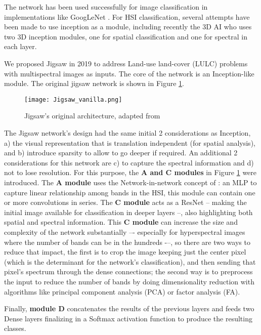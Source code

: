 \documentclass[lettersize, journal]{IEEEtran}
\begin{document}
The network has been used successfully for image classification in implementations like GoogLeNet \cite{szegedy_going_2015}. For HSI classification, several attempts have been made to use inception as a module, including recently the 3D AI \cite{fang_hyperspectral_2022} who uses two 3D inception modules, one for spatial classification and one for spectral in each layer.

We proposed Jigsaw in 2019 \cite{moraga_jigsaw_2019} to address Land-use land-cover (LULC) problems with multispectral images as inputs. The core of the network is an Inception-like module. The original jigsaw network is shown in Figure \ref{fig:Jigsaw}.

\begin{figure}[!htb]
    \centering
    \texttt{[image: Jigsaw\_vanilla.png]}
    \caption{Jigsaw's original architecture, adapted from \cite{moraga_monitoring_2020}}
    \label{fig:Jigsaw}
\end{figure}

The Jigsaw network’s design had the same initial 2 considerations as Inception, a) the visual representation that is translation independent (for spatial analysis), and b) introduce sparsity to allow to go deeper if required. An additional 2 considerations for this network are c) to capture the spectral information and d) not to lose resolution. For this purpose, the \textbf{A and C modules} in Figure \ref{fig:Jigsaw} were introduced. The \textbf{A module} uses the Network-in-network concept of \cite{lin_network_2014}: an MLP to capture linear relationship among bands in the HSI, this module can contain one or more   convolutions in series. The \textbf{C module} acts as a ResNet \cite{he_deep_2016} -- making the initial image available for classification in deeper layers --, also highlighting both spatial and spectral information. This \textbf{C module} can increase the size and complexity of the network substantially  –- especially for hyperspectral images where the number of bands can be in the hundreds -–, so there are two ways to reduce that impact, the first is to crop the image keeping just the center pixel (which is the determinant for the network’s classification), and then sending that pixel’s spectrum through the dense connections; the second way is to preprocess the input to reduce the number of bands by doing dimensionality reduction with algorithms like principal component analysis (PCA) or factor analysis (FA).

Finally, \textbf{module D} concatenates the results of the previous layers and feeds two Dense layers finalizing in a Softmax activation function to produce the resulting classes.
\end{document}

